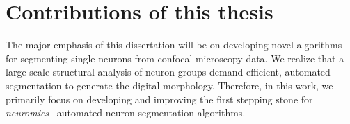 \section{Contributions of this thesis}
The major emphasis of this dissertation will be on developing novel  algorithms for segmenting single neurons from confocal microscopy data. We realize that a large scale structural analysis of neuron groups demand efficient, automated segmentation to generate the digital morphology. Therefore, in this work, we primarily focus on developing and improving the first stepping stone for \textit{neuromics}-- automated neuron segmentation algorithms. 

%
%

